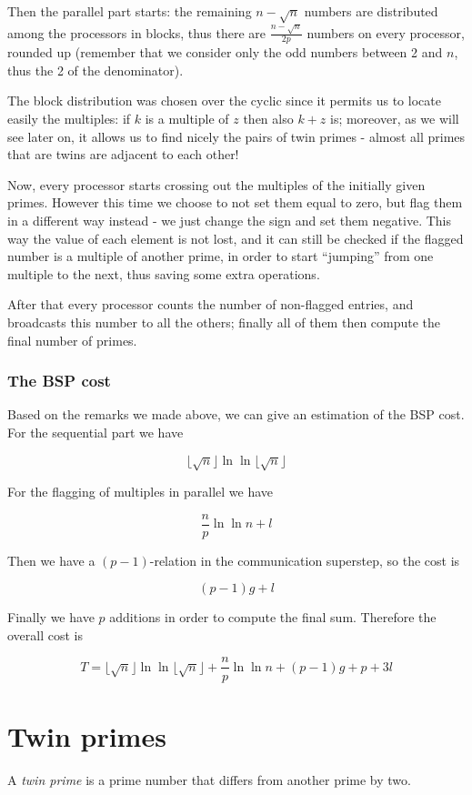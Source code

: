 \documentclass[a4paper,11pt]{article}
\begin{document}
Then the parallel part starts: the remaining $n - \sqrt{n}$ numbers are distributed among the processors in blocks, thus there are $\frac{n-\sqrt{n}}{2p}$ numbers on every processor, rounded up (remember that we consider only the odd numbers between 2 and $n$, thus the 2 of the denominator). 

The block distribution was chosen over the cyclic since it permits us to locate easily the multiples: if $k$ is a multiple of $z$ then also $k+z$ is; moreover, as we will see later on, it allows us to find nicely the pairs of twin primes - almost all primes that are twins are adjacent to each other!

Now, every processor starts crossing out the multiples of the initially given primes. However this time we choose to not set them equal to zero, but flag them in a different way instead - we just change the sign and set them negative. This way the value of each element is not lost, and it can still be checked if the flagged number is a multiple of another prime, in order to start ``jumping'' from one multiple to the next, thus saving some extra operations.

After that every processor counts the number of non-flagged entries, and broadcasts this number to all the others; finally all of them then compute the final number of primes.

\subsubsection{The BSP cost}

Based on the remarks we made above, we can give an estimation of the BSP cost. For the sequential part we have

$$\lfloor \sqrt{n} \rfloor \ln \ln \lfloor \sqrt{n} \rfloor$$

For the flagging of multiples in parallel we have

$$\frac{n}{p} \ln \ln n + l$$

Then we have a $(p-1)$-relation in the communication superstep, so the cost is 

$$(p-1)g + l$$

Finally we have $p$ additions in order to compute the final sum. Therefore the overall cost is

$$T= \lfloor \sqrt{n} \rfloor \ln \ln \lfloor \sqrt{n} \rfloor +\frac{n}{p} \ln \ln n + (p-1)g + p + 3l$$
\section{Twin primes}
A \textit{twin prime} is a prime number that differs from another prime by two.
\end{document}
